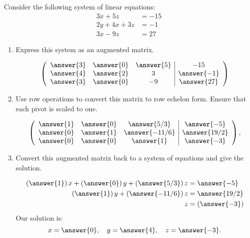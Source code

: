 \documentclass[handout]{ximera}
\author{Parisa Fatheddin}
\begin{document}
\begin{exercise}
Consider the following system of linear equations:
\begin{align*}
      3x + 5z &=  -15 \\
     2y+4x+3z&= -1\\
     3x -9z&= 27
\end{align*}
\begin{enumerate}
\item Express this system as an augmented matrix.
\begin{prompt}
\[
\left(\begin{array}{ccc|c}
  \answer{3} &  \answer{0} & \answer{5} &-15 \\
  \answer{4} & \answer{2} & 3 & \answer{-1} \\
  \answer{3} &  \answer{0} & -9 & \answer{27}
\end{array}\right)
\]
\end{prompt}
\item Use row operations to convert this matrix to row echelon form.
  Ensure that each pivot is scaled to one.
\begin{prompt}
\[
\left(\begin{array}{ccc|c}
  \answer{1} &  \answer{0} & \answer{5/3} &\answer{-5} \\
  \answer{0} & \answer{1} & \answer{-11/6} & \answer{19/2} \\
  \answer{0} &  \answer{0} & \answer{1} & \answer{-3}
\end{array}\right),
\]
\end{prompt}
\item Convert this augmented matrix back to a system of equations
and give the solution.
\begin{prompt}
\begin{align*}
      \left(\answer{1}\right)x + \left(\answer{0}\right)y + \left(\answer{5/3}\right)z &= \answer{-5} \\
     \left(\answer{1}\right)y+\left(\answer{-11/6}\right)z&=\answer{19/2}\\
     z&=\left(\answer{-3}\right)
\end{align*}
Our solution is:
\[
x= \answer{0}, \quad y= \answer{4}, \quad z=\answer{-3}.
\]
\end{prompt}
\end{enumerate}
\end{exercise}
\end{document}
